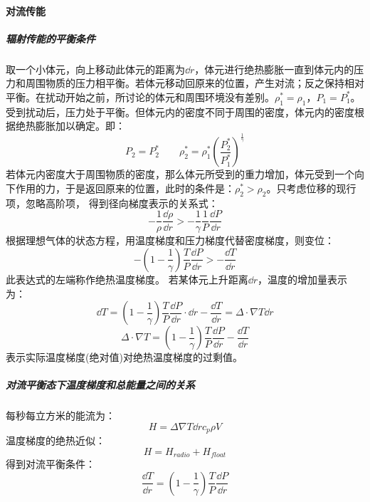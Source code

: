 \paragraph{对流传能}
\subparagraph{辐射传能的平衡条件}
取一个小体元，向上移动此体元的距离为$\dd r$，体元进行绝热膨胀一直到体元内的压力和周围物质的压力相平衡。若体元移动回原来的位置，产生对流；反之保持相对平衡。在扰动开始之前，所讨论的体元和周围环境没有差别。$\rho^{*}_{1}=\rho_{1}$，$P_{1}=P^{*}_{1}$。受到扰动后，压力处于平衡。但体元内的密度不同于周围的密度，体元内的密度根据绝热膨胀加以确定。即：
\begin{equation}
	P_{2}=P^*_{2}\qquad \rho^{*}_{2}=\rho^{*}_{1}\left(\frac{P^*_{2}}{P^*_{1}}\right)^{\frac{1}{\gamma}}
\end{equation}
若体元内密度大于周围物质的密度，那么体元所受到的重力增加，体元受到一个向下作用的力，于是返回原来的位置，此时的条件是：$\rho^{*}_{2}>\rho_{2}$。只考虑位移的现行项，忽略高阶项，
得到径向梯度表示的关系式：
\begin{equation}
	-\frac{1}{\rho}\frac{\dd \rho}{\dd r}>-\frac{1}{\gamma}\frac{1}{P}\frac{\dd P}{\dd r}
\end{equation}
根据理想气体的状态方程，用温度梯度和压力梯度代替密度梯度，则变位：
\begin{equation}
	-\left(1-\frac{1}{\gamma}\right)\frac{T}{P}\frac{\dd P}{\dd r}>-\frac{\dd T}{\dd r}
\end{equation}
此表达式的左端称作绝热温度梯度。
若某体元上升距离$\dd r$，温度的增加量表示为：
\begin{equation}
	\dd T=\left(1-\frac{1}{\gamma}\right)\frac{T}{P}\frac{\dd P}{\dd r}\cdot\dd r-\frac{\dd T}{\dd r}=\Delta\cdot\nabla T\dd r
\end{equation}
\begin{equation}
	\Delta\cdot\nabla T=\left(1-\frac{1}{\gamma}\right)\frac{T}{P}\frac{\dd P}{\dd r}-\frac{\dd T}{\dd r}
\end{equation}
表示实际温度梯度(绝对值)对绝热温度梯度的过剩值。

\subparagraph{对流平衡态下温度梯度和总能量之间的关系}
每秒每立方米的能流为：
\begin{equation}
	H=\Delta\nabla T\dd rc_{p}\rho V
\end{equation}
温度梯度的绝热近似：
\begin{equation}
	H=H_{radio}+H_{float}
\end{equation}
得到对流平衡条件：
\begin{equation}
	\frac{\dd T}{\dd r}=\left(1-\frac{1}{\gamma}\right)\frac{T}{P}\frac{\dd P}{\dd r}
\end{equation}
